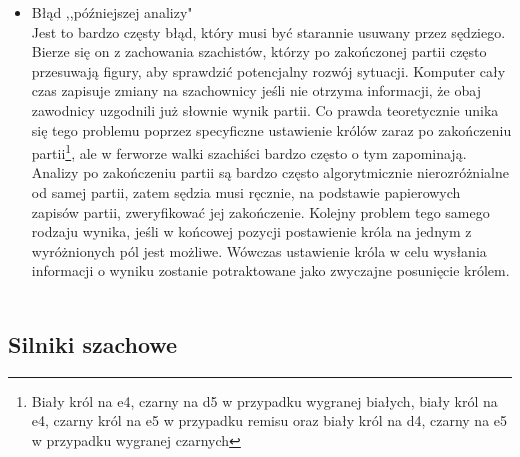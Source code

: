 \documentclass[12pt,leqno]{article}
\begin{document}
\begin{itemize}
\item Błąd ,,późniejszej analizy"\\
Jest to bardzo częsty błąd, który musi być starannie usuwany przez sędziego. Bierze się on z zachowania szachistów, którzy po zakończonej partii często przesuwają figury, aby sprawdzić potencjalny rozwój sytuacji. Komputer cały czas zapisuje zmiany na szachownicy jeśli nie otrzyma informacji, że obaj zawodnicy uzgodnili już słownie wynik partii. Co prawda teoretycznie unika się tego problemu poprzez specyficzne ustawienie królów zaraz po zakończeniu partii\footnote{Biały król na e4, czarny na d5 w przypadku wygranej białych, biały król na e4, czarny król na e5 w przypadku remisu oraz biały król na d4, czarny na e5 w przypadku wygranej czarnych}, ale w ferworze walki szachiści bardzo często o tym zapominają. Analizy po zakończeniu partii są bardzo często algorytmicznie nierozróżnialne od samej partii, zatem sędzia musi ręcznie, na podstawie papierowych zapisów partii, zweryfikować jej zakończenie. Kolejny problem tego samego rodzaju wynika, jeśli w końcowej pozycji postawienie króla na jednym z wyróżnionych pól jest możliwe. Wówczas ustawienie króla w celu wysłania informacji o wyniku zostanie potraktowane jako zwyczajne posunięcie królem.\\\\


\end{itemize}

\subsection{Silniki szachowe}
\end{document}
